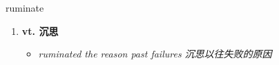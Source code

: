 
\begin{frame}
{\huge ruminate}
\begin{center}
\begin{enumerate}\Large
  \item \textbf{vt. 沉思}
  \begin{itemize}
    \item \em{\Large{ruminated the reason past failures 沉思以往失败的原因}}
  \end{itemize}
\end{enumerate}
\end{center}
\end{frame}
